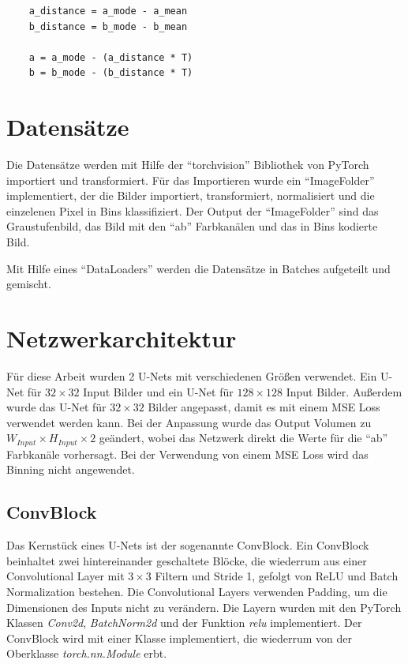 \begin{listing}[H]
  \begin{verbatim}
    a_distance = a_mode - a_mean
    b_distance = b_mode - b_mean

    a = a_mode - (a_distance * T)
    b = b_mode - (b_distance * T)
  \end{verbatim}
\end{listing}

\section{Datensätze}
Die Datensätze werden mit Hilfe der ``torchvision'' Bibliothek von PyTorch importiert und transformiert. Für das Importieren wurde ein
``ImageFolder'' implementiert, der die Bilder importiert, transformiert, normalisiert und die einzelenen Pixel in Bins klassifiziert. 
Der Output der ``ImageFolder'' sind das Graustufenbild, das Bild mit den ``ab'' Farbkanälen und das in Bins kodierte Bild.

Mit Hilfe eines ``DataLoaders'' werden die Datensätze in Batches aufgeteilt und gemischt.

\section{Netzwerkarchitektur}
Für diese Arbeit wurden 2 U-Nets mit verschiedenen Größen verwendet. Ein U-Net für $ 32 \times 32 $ Input Bilder und ein U-Net für $ 128 \times 128 $ 
Input Bilder. Außerdem wurde das U-Net für $ 32 \times 32 $ Bilder angepasst, damit es mit einem MSE Loss verwendet werden kann. Bei der Anpassung wurde
das Output Volumen zu $ W_{Input} \times H_{Input} \times 2 $ geändert, wobei das Netzwerk direkt die Werte für die ``ab'' Farbkanäle vorhersagt.
Bei der Verwendung von einem MSE Loss wird das Binning nicht angewendet.
 
\subsection{ConvBlock}
Das Kernstück eines U-Nets ist der sogenannte ConvBlock. Ein ConvBlock beinhaltet zwei hintereinander geschaltete Blöcke, die wiederrum %
aus einer Convolutional Layer mit $3 \times 3$ Filtern und Stride 1, gefolgt von ReLU und Batch Normalization bestehen. 
Die Convolutional Layers verwenden Padding, um die Dimensionen des Inputs nicht zu verändern. Die Layern wurden mit den PyTorch 
Klassen \textit{Conv2d}, \textit{BatchNorm2d} und der Funktion \textit{relu} implementiert. Der ConvBlock wird mit einer Klasse implementiert,
die wiederrum von der Oberklasse \textit{torch.nn.Module} erbt.

